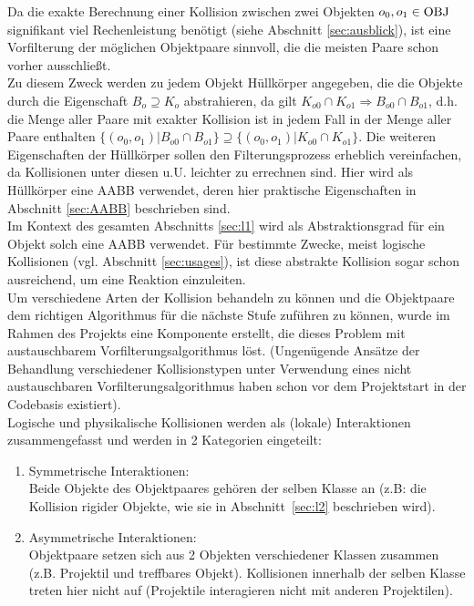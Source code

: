 \label{sec:l1}
Da die exakte Berechnung einer Kollision zwischen zwei Objekten $o_0, o_1 \in \operatorname{OBJ}$ signifikant viel Rechenleistung benötigt (siehe Abschnitt \ref{sec:ausblick}), ist eine Vorfilterung der möglichen Objektpaare sinnvoll, die die meisten Paare schon vorher ausschließt.\\
Zu diesem Zweck werden zu jedem Objekt Hüllkörper angegeben, die die Objekte durch die Eigenschaft $B_o \supseteq K_o$ abstrahieren, da gilt $K_{o0} \cap K_{o1} \Rightarrow B_{o0} \cap B_{o1}$, d.h.~ die Menge aller Paare mit exakter Kollision ist in jedem Fall in der Menge aller Paare enthalten $ \{ (o_0, o_1) | B_{o0} \cap B_{o1} \} \supseteq \{ (o_0, o_1) | K_{o0} \cap K_{o1} \} $.
Die weiteren Eigenschaften der Hüllkörper sollen den Filterungsprozess erheblich vereinfachen, da Kollisionen unter diesen u.U. leichter zu errechnen sind. Hier wird als Hüllkörper eine AABB verwendet, deren hier praktische Eigenschaften in Abschnitt \ref{sec:AABB} beschrieben sind.\\
Im Kontext des gesamten Abschnitts \ref{sec:l1} wird als Abstraktionsgrad für ein Objekt solch eine AABB verwendet. Für bestimmte Zwecke, meist logische Kollisionen (vgl. Abschnitt \ref{sec:usages}), ist diese abstrakte Kollision sogar schon ausreichend, um eine Reaktion einzuleiten.\\
Um verschiedene Arten der Kollision behandeln zu können und die Objektpaare dem richtigen Algorithmus für die nächste Stufe zuführen zu können, wurde im Rahmen des Projekts eine Komponente erstellt, die dieses Problem mit austauschbarem Vorfilterungsalgorithmus löst. (Ungenügende Ansätze der Behandlung verschiedener Kollisionstypen unter Verwendung eines nicht austauschbaren Vorfilterungsalgorithmus haben schon vor dem Projektstart in der Codebasis existiert). \\
Logische und physikalische Kollisionen werden als (lokale) Interaktionen zusammengefasst und werden in 2 Kategorien eingeteilt:
\begin{enumerate}
\item Symmetrische Interaktionen:\\
Beide Objekte des Objektpaares gehören der selben Klasse an (z.B: die Kollision rigider Objekte, wie sie in Abschnitt~\ref{sec:l2} beschrieben wird).
\item Asymmetrische Interaktionen:\\
Objektpaare setzen sich aus 2 Objekten verschiedener Klassen zusammen (z.B. Projektil und treffbares Objekt). Kollisionen innerhalb der selben Klasse treten hier nicht auf (Projektile interagieren nicht mit anderen Projektilen).
\end{enumerate}

